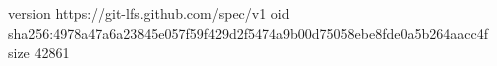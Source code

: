 version https://git-lfs.github.com/spec/v1
oid sha256:4978a47a6a23845e057f59f429d2f5474a9b00d75058ebe8fde0a5b264aacc4f
size 42861
